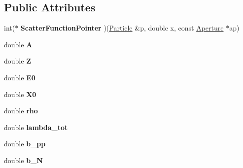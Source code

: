 \subsection*{Public Attributes}
\begin{DoxyCompactItemize}
\item 
\mbox{\label{classParticleTracking_1_1ProtonBunch_ab98c607c379ce030fc1335366aaa6dbc}} 
int($\ast$ {\bfseries Scatter\+Function\+Pointer} )(\hyperlink{classPSvector}{Particle} \&p, double x, const \hyperlink{classAperture}{Aperture} $\ast$ap)
\item 
\mbox{\label{classParticleTracking_1_1ProtonBunch_a183cc9f7def8e96a95db83570e080171}} 
double {\bfseries A}
\item 
\mbox{\label{classParticleTracking_1_1ProtonBunch_aab3791b31fa7883d107746d1cc4d0dcb}} 
double {\bfseries Z}
\item 
\mbox{\label{classParticleTracking_1_1ProtonBunch_a0ba2f4b07908cfe6f71d868858a686e4}} 
double {\bfseries E0}
\item 
\mbox{\label{classParticleTracking_1_1ProtonBunch_a70d07d12b0a2aab1fbdeb76f665d1105}} 
double {\bfseries X0}
\item 
\mbox{\label{classParticleTracking_1_1ProtonBunch_aea79b945bd9e0062482ba0d46b43e4fe}} 
double {\bfseries rho}
\item 
\mbox{\label{classParticleTracking_1_1ProtonBunch_a24911689ef1f24f60ceeec827e849a7d}} 
double {\bfseries lambda\+\_\+tot}
\item 
\mbox{\label{classParticleTracking_1_1ProtonBunch_a8c8d770d71f56702793885ba7207b958}} 
double {\bfseries b\+\_\+pp}
\item 
\mbox{\label{classParticleTracking_1_1ProtonBunch_a3015153bb724456c5f1c3a6f8ea84e6a}} 
double {\bfseries b\+\_\+N}
\item 

\end{DoxyCompactItemize}
